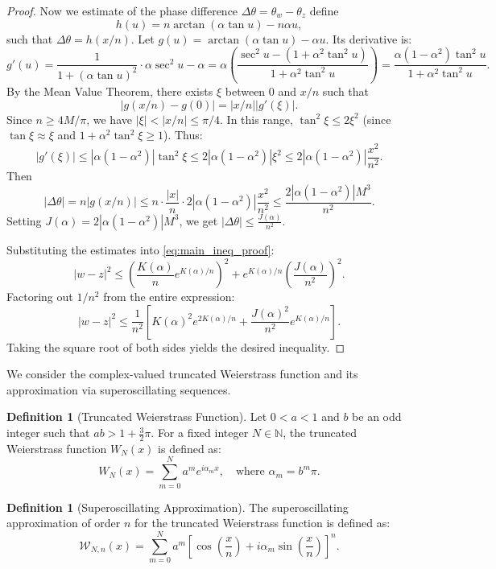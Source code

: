 \documentclass[reqno,11pt]{amsart}
\theoremstyle{definition}
\newtheorem{definition}[theorem]{Definition}
\begin{document}
\begin{proof}
\medskip
Now we estimate of the phase difference $\Delta \theta = \theta_w - \theta_z$
define
$$h(u) = n \arctan(\alpha \tan u) - n \alpha u,
$$
 such that $\Delta \theta = h(x/n)$. Let $g(u) = \arctan(\alpha \tan u) - \alpha u$. Its derivative is:
\[
    g'(u) = \frac{1}{1 + (\alpha \tan u)^2} \cdot \alpha \sec^2 u - \alpha = \alpha \left( \frac{\sec^2 u - (1 + \alpha^2 \tan^2 u)}{1 + \alpha^2 \tan^2 u} \right) = \frac{\alpha(1-\alpha^2)\tan^2 u}{1+\alpha^2 \tan^2 u}.
\]
By the Mean Value Theorem, there exists $\xi$ between $0$ and $x/n$ such that
$$|g(x/n) - g(0)| = |x/n| |g'(\xi)|.
$$
 Since $n \ge 4M/\pi$, we have $|\xi| < |x/n| \le \pi/4$. In this range, $\tan^2 \xi \le 2\xi^2$ (since $\tan \xi \approx \xi$ and $1+\alpha^2 \tan^2 \xi \ge 1$). Thus:
\[
    |g'(\xi)| \leq |\alpha(1-\alpha^2)| \tan^2 \xi \leq 2 |\alpha(1-\alpha^2)| \xi^2 \leq 2 |\alpha(1-\alpha^2)| \frac{x^2}{n^2}.
\]
Then
$$|\Delta \theta| = n |g(x/n)| \leq n \cdot \frac{|x|}{n} \cdot 2 |\alpha(1-\alpha^2)| \frac{x^2}{n^2} \leq \frac{2 |\alpha(1-\alpha^2)| M^3}{n^2}.
$$
Setting $J(\alpha) = 2|\alpha(1-\alpha^2)|M^3$, we get $|\Delta \theta| \leq \frac{J(\alpha)}{n^2}$.

\medskip
Substituting the estimates into \eqref{eq:main_ineq_proof}:
\[
    |w-z|^2 \leq \left( \frac{K(\alpha)}{n} e^{K(\alpha)/n} \right)^2 + e^{K(\alpha)/n} \left( \frac{J(\alpha)}{n^2} \right)^2.
\]
Factoring out $1/n^2$ from the entire expression:
\[
    |w-z|^2 \leq \frac{1}{n^2} \left[ K(\alpha)^2 e^{2K(\alpha)/n} + \frac{J(\alpha)^2}{n^2} e^{K(\alpha)/n} \right].
\]
Taking the square root of both sides yields the desired inequality.
\end{proof}


We consider the complex-valued truncated Weierstrass function and its approximation via superoscillating sequences.

\begin{definition}[Truncated Weierstrass Function]
Let $0 < a < 1$ and $b$ be an odd integer such that $ab > 1 + \frac{3}{2}\pi$. For a fixed integer $N \in \mathbb{N}$, the truncated Weierstrass function $W_N(x)$ is defined as:
\begin{equation} \label{eq:truncated_weierstrass}
    W_N(x) = \sum_{m=0}^{N} a^m e^{i \alpha_m x}, \quad \text{where } \alpha_m = b^m \pi.
\end{equation}
\end{definition}

\begin{definition}[Superoscillating Approximation]
The superoscillating approximation of order $n$ for the truncated Weierstrass function is defined as:
\begin{equation} \label{eq:super_weierstrass}
    \mathcal{W}_{N, n}(x) = \sum_{m=0}^{N} a^m \left[ \cos\left(\frac{x}{n}\right) + i \alpha_m \sin\left(\frac{x}{n}\right) \right]^n.
\end{equation}
\end{definition}
\end{document}
